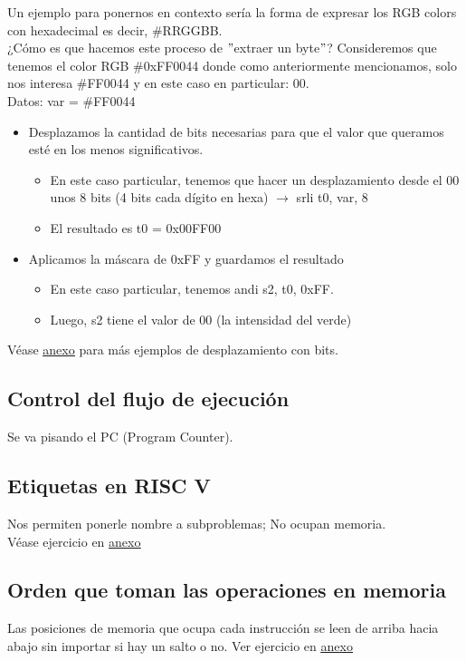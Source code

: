\documentclass[10pt,a4paper]{article}
\begin{document}
Un ejemplo para ponernos en contexto sería la forma de expresar los RGB colors con hexadecimal es decir, \#RRGGBB. \\
¿Cómo es que hacemos este proceso de $"$extraer un byte$"$? Consideremos que tenemos el color RGB \#0xFF0044 donde como anteriormente mencionamos, solo nos interesa \#FF0044 y en este caso en particular: 00. \\
Datos: 
var = \#FF0044 
\begin{itemize}
    \item Desplazamos la cantidad de bits necesarias para que el valor que queramos esté en los menos significativos.
    \begin{itemize}
        \item En este caso particular, tenemos que hacer un desplazamiento desde el 00 unos 8 bits (4 bits cada dígito en hexa) $ \rightarrow $ srli t0, var, 8
        \item El resultado es t0 = 0x00FF00
    \end{itemize}
    \item Aplicamos la máscara de 0xFF y guardamos el resultado
    \begin{itemize}
        \item En este caso particular, tenemos andi s2, t0, 0xFF.
        \item Luego, s2 tiene el valor de 00 (la intensidad del verde)
    \end{itemize}
\end{itemize} 
Véase \hyperref[subsec:desplazamiento_bits]{\underline{anexo}} para más ejemplos de desplazamiento con bits.
\subsection*{Control del flujo de ejecución}
Se va pisando el PC (Program Counter). 
\subsection*{Etiquetas en RISC V}
Nos permiten ponerle nombre a subproblemas; No ocupan memoria. \\

Véase ejercicio en \hyperref[subsec:ejercicios_etiquetas]{\underline{anexo}}
\subsection*{Orden que toman las operaciones en memoria}
Las posiciones de memoria que ocupa cada instrucción se leen de arriba hacia abajo sin importar si hay un salto o no.
Ver ejercicio en \hyperref[subsec:TPRVC]{\underline{anexo}} 
\end{document}
